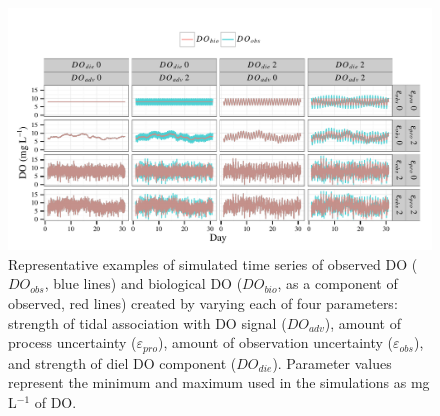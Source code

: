 \documentclass[letterpaper,12pt,oneside]{article}\usepackage[]{graphicx}\usepackage[]{color}
\newenvironment{knitrout}{}{} %
\begin{document}
\centering\vspace*{\fill}
\begin{knitrout}
\color{fgcolor}\begin{figure}[!ht]


{\centering \includegraphics[width=\textwidth]{figure/sim_ex} 

}

\caption[Representative examples of simulated time series of observed \ac{DO} ($DO_{obs}$, blue lines) and biological \ac{DO} ($DO_{bio}$, as a component of observed, red lines) created by varying each of four parameters]{Representative examples of simulated time series of observed \ac{DO} ($DO_{obs}$, blue lines) and biological \ac{DO} ($DO_{bio}$, as a component of observed, red lines) created by varying each of four parameters: strength of tidal association with \ac{DO} signal ($DO_{adv}$), amount of process uncertainty ($\varepsilon_{pro}$), amount of observation uncertainty ($\varepsilon_{obs}$), and strength of diel \ac{DO} component ($DO_{die}$).  Parameter values represent the minimum and maximum used in the simulations as mg L$^{-1}$ of \ac{DO}.\label{fig:sim_ex}}
\end{figure}


\end{knitrout}
\vfill
\clearpage
\end{document}
